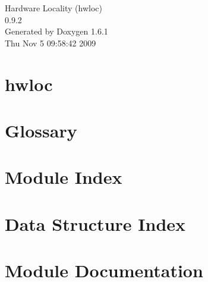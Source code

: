 \documentclass[letterpaper]{book}
\begin{document}
\hypersetup{pageanchor=false}
\begin{titlepage}
\vspace*{7cm}
\begin{center}
{\Large Hardware Locality (hwloc) \\[1ex]\large 0.9.2 }\\
\vspace*{1cm}
{\large Generated by Doxygen 1.6.1}\\
\vspace*{0.5cm}
{\small Thu Nov 5 09:58:42 2009}\\
\end{center}
\end{titlepage}
\clearemptydoublepage
{}
\tableofcontents
\clearemptydoublepage
{}
\hypersetup{pageanchor=true}
\chapter{hwloc}
\label{index}\hypertarget{index}{}
\chapter{Glossary}
\label{glossary}
\hypertarget{glossary}{}

\chapter{Module Index}

\chapter{Data Structure Index}

\chapter{Module Documentation}
























\end{document}
